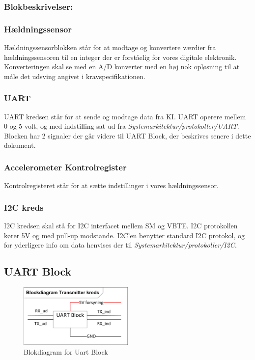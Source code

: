 \subsubsection{Blokbeskrivelser:}
\subsubsection{Hældningssensor}
Hældningssensorblokken står for at modtage og konvertere værdier fra hældningssensoren til en integer der er forståelig for vores digitale elektronik. Konverteringen skal se med en A/D konverter med en høj nok opløsning til at måle det udsving angivet i kravspecifikationen.
\subsubsection{UART}
UART kredsen står for at sende og modtage data fra KI. UART operere mellem 0 og 5 volt, og med indstilling sat ud fra \textit{Systemarkitektur/protokoller/UART}. Blocken har 2 signaler der går videre til UART Block, der beskrives senere i dette dokument. 
\subsubsection{Accelerometer Kontrolregister}
Kontrolregisteret står for at sætte indstillinger i vores hældningssensor.
\subsubsection{I2C kreds}
I2C kredsen skal stå for I2C interfacet mellem SM og VBTE. I2C protokollen kører 5V og med pull-up modstande. I2C'en benytter standard I2C protokol, og for yderligere info om data henvises der til \textit{Systemarkitektur/protokoller/I2C}.
\subsection{UART Block}
\begin{figure}[H]
\centering
\includegraphics[width=0.5\textwidth]{billeder/uartblock}
\caption{Blokdiagram for Uart Block}
\label{fig:SMUART}
\end{figure}
